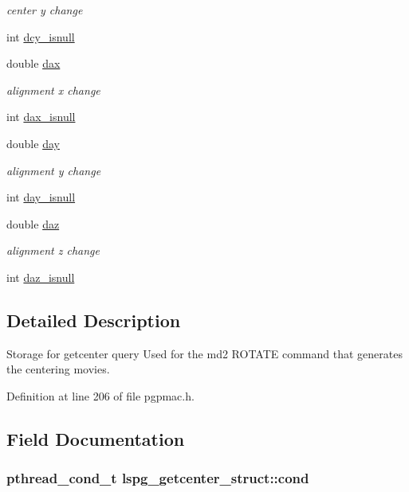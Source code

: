 \begin{DoxyCompactItemize}
\begin{DoxyCompactList}\small\item\em center y change \end{DoxyCompactList}\item 
int \hyperlink{structlspg__getcenter__struct_a352c48c8d443c52f18ebd13019d01684}{dcy\-\_\-isnull}
\item 
double \hyperlink{structlspg__getcenter__struct_a17db52848c28852a470222ec93ae8886}{dax}
\begin{DoxyCompactList}\small\item\em alignment x change \end{DoxyCompactList}\item 
int \hyperlink{structlspg__getcenter__struct_a621b489777d61e9db8b33b784b8d70f9}{dax\-\_\-isnull}
\item 
double \hyperlink{structlspg__getcenter__struct_a9ce0f29540f2ff47be9788565d19f1b8}{day}
\begin{DoxyCompactList}\small\item\em alignment y change \end{DoxyCompactList}\item 
int \hyperlink{structlspg__getcenter__struct_a36f57a319288810caf365cca7827ff96}{day\-\_\-isnull}
\item 
double \hyperlink{structlspg__getcenter__struct_a1170bab2161f03ab29c39f79519ed9ae}{daz}
\begin{DoxyCompactList}\small\item\em alignment z change \end{DoxyCompactList}\item 
int \hyperlink{structlspg__getcenter__struct_a36742b6bd0f4bf9356414930ba893617}{daz\-\_\-isnull}
\end{DoxyCompactItemize}


\subsection{Detailed Description}
Storage for getcenter query Used for the md2 R\-O\-T\-A\-T\-E command that generates the centering movies. 

Definition at line 206 of file pgpmac.\-h.



\subsection{Field Documentation}
\hypertarget{structlspg__getcenter__struct_ae0db0ff2608ab5ba3e7c1b4ad3fc0e91}{
\subsubsection[{cond}]{\setlength{\rightskip}{0pt plus 5cm}pthread\-\_\-cond\-\_\-t lspg\-\_\-getcenter\-\_\-struct\-::cond}}\label{structlspg__getcenter__struct_ae0db0ff2608ab5ba3e7c1b4ad3fc0e91}


